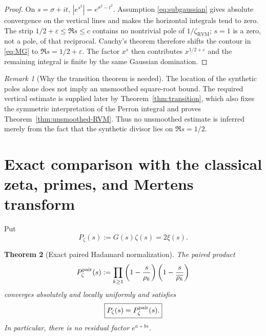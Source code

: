 \documentclass[11pt,reqno]{amsart}
\newtheorem{theorem}{Theorem}[section]
\theoremstyle{definition}
\theoremstyle{remark}
\newtheorem{remark}[theorem]{Remark}
\newcommand{\eps}{\varepsilon}
\newcommand{\RVM}{\mathrm{RVM}}
\begin{document}
\begin{proof}
On $s=\sigma+it$, $|e^{s^2}|=e^{\sigma^2-t^2}$.  Assumption \eqref{eq:subgaussian} gives absolute convergence on the vertical lines and makes the horizontal integrals tend to zero.  The strip $1/2+\eps\le\Re s\le c$ contains no nontrivial pole of $1/\zeta_{\RVM}$; $s=1$ is a zero, not a pole, of that reciprocal.  Cauchy's theorem therefore shifts the contour in \eqref{eq:MG} to $\Re s=1/2+\eps$.  The factor $x^s$ then contributes $x^{1/2+\eps}$ and the remaining integral is finite by the same Gaussian domination.
\end{proof}

\begin{remark}[Why the transition theorem is needed]\label{rem:unsmoothed-separate}
The location of the synthetic poles alone does not imply an unsmoothed square-root bound.  The required vertical estimate is supplied later by Theorem~\ref{thm:transition}, which also fixes the symmetric interpretation of the Perron integral and proves Theorem~\ref{thm:unsmoothed-RVM}.  Thus no unsmoothed estimate is inferred merely from the fact that the synthetic divisor lies on $\Re s=1/2$.
\end{remark}

\section{Exact comparison with the classical zeta, primes, and Mertens transform}

Put
\begin{equation}\label{eq:Pzeta}
 P_\zeta(s):=G(s)\zeta(s)=2\xi(s).
\end{equation}

\begin{theorem}[Exact paired Hadamard normalization]\label{thm:Hadamard}
The paired product
\begin{equation}\label{eq:paired-product}
 P_\zeta^{\rm pair}(s)
 :=\prod_{k\ge1}
 \left(1-\frac{s}{\rho_k}\right)
 \left(1-\frac{s}{\overline{\rho_k}}\right)
\end{equation}
converges absolutely and locally uniformly and satisfies
\begin{equation}\label{eq:Hadamard-exact}
 \boxed{P_\zeta(s)=P_\zeta^{\rm pair}(s).}
\end{equation}
In particular, there is no residual factor $e^{a+bs}$.
\end{theorem}
\end{document}
